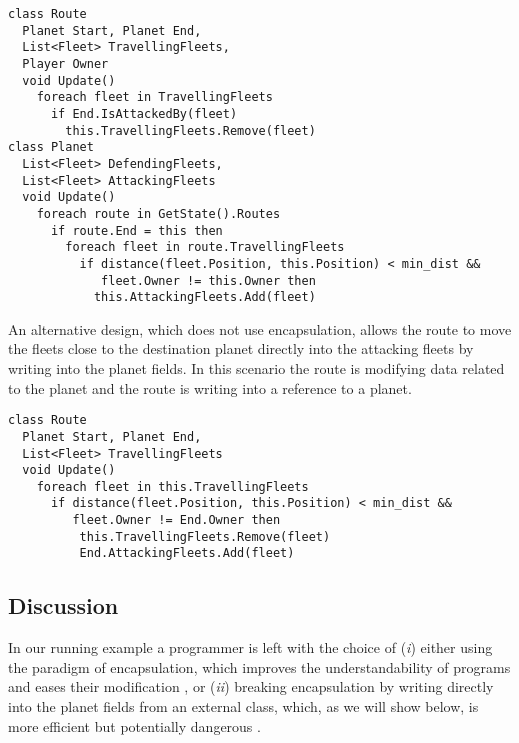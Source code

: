 \begin{lstlisting}
class Route
  Planet Start, Planet End,
  List<Fleet> TravellingFleets,
  Player Owner
  void Update()
    foreach fleet in TravellingFleets
      if End.IsAttackedBy(fleet)
        this.TravellingFleets.Remove(fleet)
class Planet
  List<Fleet> DefendingFleets,
  List<Fleet> AttackingFleets
  void Update()
    foreach route in GetState().Routes
      if route.End = this then
        foreach fleet in route.TravellingFleets
          if distance(fleet.Position, this.Position) < min_dist && 
             fleet.Owner != this.Owner then
            this.AttackingFleets.Add(fleet)
\end{lstlisting}


An alternative design, which does not use encapsulation, allows the route to move the fleets close to the destination planet directly into the attacking fleets by writing into the planet fields. In this scenario the route is modifying data related to the planet and the route is writing into a reference to a planet.
\begin{lstlisting}
class Route
  Planet Start, Planet End,
  List<Fleet> TravellingFleets
  void Update()
    foreach fleet in this.TravellingFleets
      if distance(fleet.Position, this.Position) < min_dist && 
         fleet.Owner != End.Owner then
          this.TravellingFleets.Remove(fleet)
          End.AttackingFleets.Add(fleet)
\end{lstlisting}
\subsection{Discussion}
In our running example a programmer is left with the choice of (\textit{i}) either using the paradigm of encapsulation, which improves the understandability of programs and eases their modification \cite{ENCAPSULATION_AND_INHERITANCE_IN_OOP}, or (\textit{ii}) breaking encapsulation by writing directly into the planet fields from an external class, which, as we will show below, is more efficient but potentially dangerous \cite{eder1994coupling}.

